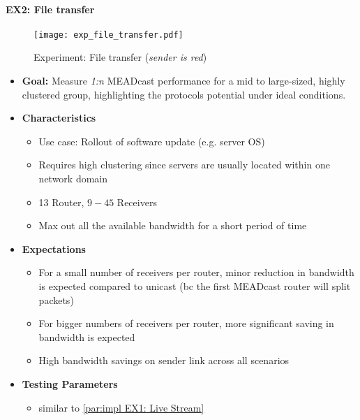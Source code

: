 \paragraph{EX2: File transfer} %
\label{par:implEX2: File transfer}

\begin{figure}[!htbp]
    \begin{center}
        \texttt{[image: exp\_file\_transfer.pdf]}
    \end{center}
    \caption{Experiment: File transfer (\textit{sender is red})}
    \label{fig:exp_file_transfer}
\end{figure}

\begin{itemize}\itemsep0em
    \item \textbf{Goal:} Measure \textit{1:n} MEADcast performance for a
        mid to large-sized, highly clustered group, highlighting the protocols
        potential under ideal conditions.
    \item[] \textbf{Characteristics}
    \begin{itemize}\itemsep0em
        \item Use case: Rollout of software update (e.g. server OS)
        \item Requires high clustering since servers are usually located within
            one network domain
        \item 13 Router, $9-45$ Receivers
        \item Max out all the available bandwidth for a short period of time
            \cite{cartesian_us_bw}
    \end{itemize}
    \item[] \textbf{Expectations}
    \begin{itemize}\itemsep0em
        \item For a small number of receivers per router, minor reduction in
            bandwidth is expected compared to unicast (bc the first MEADcast
            router will split packets)
        \item For bigger numbers of receivers per router, more significant
            saving in bandwidth is expected
        \item High bandwidth savings on sender link across all scenarios
    \end{itemize}
    \item[] \textbf{Testing Parameters}
    \begin{itemize}\itemsep0em
        \item similar to \autoref{par:impl EX1: Live Stream}
    \end{itemize}
\end{itemize}
\newpage

